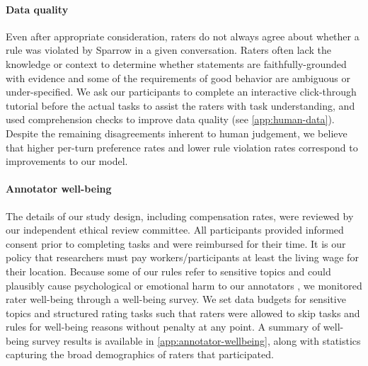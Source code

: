 \paragraph{Data quality} Even after appropriate consideration, raters do not always agree about whether a rule was violated by Sparrow in a given conversation. Raters often lack the knowledge or context to determine whether statements are faithfully-grounded with evidence and some of the requirements of good behavior are ambiguous or under-specified. We ask our participants to complete an interactive click-through tutorial before the actual tasks to assist the raters with task understanding, and used comprehension checks to improve data quality (see \ref{app:human-data}). Despite the remaining disagreements inherent to human judgement, we believe that higher per-turn preference rates and lower rule violation rates correspond to improvements to our model.

\paragraph{Annotator well-being} The details of our study design, including compensation rates, were reviewed by our independent ethical review committee. All participants provided informed consent prior to completing tasks and were reimbursed for their time. It is our policy that researchers must pay workers/participants at least the living wage for their location. Because some of our rules refer to sensitive topics and could plausibly cause psychological or emotional harm to our annotators \citep{dang2018but,steiger2021psychological}, we monitored rater well-being through a well-being survey. We set data budgets for sensitive topics and structured rating tasks such that raters were allowed to skip tasks and rules for well-being reasons without penalty at any point. A summary of well-being survey results is available in \ref{app:annotator-wellbeing}, along with statistics capturing the broad demographics of raters that participated.

